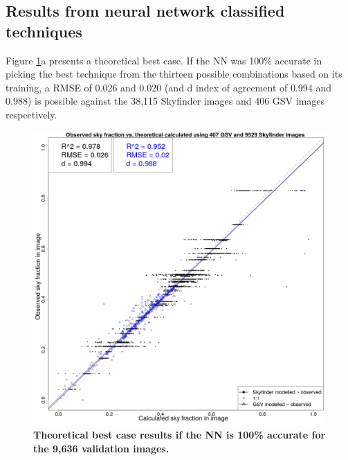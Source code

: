 \documentclass[final,3p,times,authoryear]{elsarticle}
\begin{document}
\subsection{Results from neural network classified techniques}\label{sec:resultsnn}
Figure \ref{fig:errorplots}a presents a theoretical best case. If the NN was 100\% accurate in picking the best technique from the thirteen possible combinations based on its training, a RMSE of 0.026 and 0.020 (and d index of agreement of 0.994 and 0.988) is possible against the 38,115 Skyfinder images and 406 GSV images respectively. 

\begin{figure}
\centering
\includegraphics[scale=0.15]{Images/ErrorPlots1Combined.png}

\caption{\textbf{
Theoretical best case results if the NN is 100\% accurate for the 9,636 validation images. 
}}
\label{fig:errorplotscntk} \label{fig:errorplots}
\end{figure}
\end{document}
